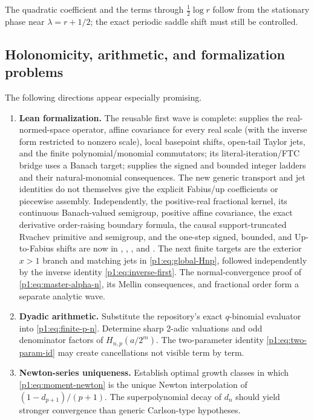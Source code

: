 \documentclass[11pt,oneside]{article}
\theoremstyle{definition}
\theoremstyle{remark}
\newcommand{\1}{\mathbf 1}
\begin{document}
The quadratic coefficient and the terms through \(\frac12\log r\) follow from
the stationary phase near \(\lambda=r+1/2\); the exact periodic saddle shift
must still be controlled.

\subsection{Holonomicity, arithmetic, and formalization problems}
The following directions appear especially promising.
\begin{enumerate}
\item \textbf{Lean formalization.}  The reusable first wave is complete:
 supplies the real-normed-space operator,
affine covariance for every real scale (with the inverse form restricted to
nonzero scale), local basepoint shifts, open-tail Taylor jets, and the finite
polynomial/monomial commutators; its literal-iteration/FTC bridge uses a Banach target;
 supplies the signed and bounded
integer ladders and their natural-monomial consequences.  The new generic
transport and jet identities do not themselves give the explicit Fabius/up
coefficients or piecewise assembly.  Independently, the positive-real fractional kernel,
its continuous Banach-valued semigroup, positive affine covariance, the exact derivative
order-raising boundary formula, the causal support-truncated Rvachev primitive and semigroup,
and the one-step signed, bounded, and Up-to-Fabius shifts are now in
, ,
, and .  The next
finite targets are the exterior
\(x>1\) branch and matching jets in
\eqref{p1:eq:global-Hnp}, followed independently by the inverse identity
\eqref{p1:eq:inverse-first}.  The normal-convergence proof of
\eqref{p1:eq:master-alpha-n}, its Mellin consequences, and fractional order form
a separate analytic wave.

\item \textbf{Dyadic arithmetic.}  Substitute the repository's exact
\(q\)-binomial evaluator into \eqref{p1:eq:finite-p-n}.  Determine sharp
2-adic valuations and odd denominator factors of
\(H_{n,p}(a/2^m)\).  The two-parameter identity
\eqref{p1:eq:two-param-id} may create cancellations not visible term by term.

\item \textbf{Newton-series uniqueness.}  Establish optimal growth classes in
which \eqref{p1:eq:moment-newton} is the unique Newton interpolation of
\((1-d_{p+1})/(p+1)\).  The superpolynomial decay of \(d_n\) should yield
stronger convergence than generic Carlson-type hypotheses.


\end{enumerate}
\end{document}
